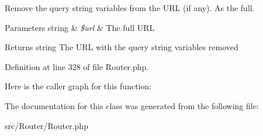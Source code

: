 Remove the query string variables from the U\+RL (if any). As the full.


\begin{DoxyParams}[1]{Parameters}
string & {\em \$url} & The full U\+RL\\
\hline
\end{DoxyParams}
\begin{DoxyReturn}{Returns}
string The U\+RL with the query string variables removed 
\end{DoxyReturn}


Definition at line 328 of file Router.\+php.

Here is the caller graph for this function\+:


The documentation for this class was generated from the following file\+:\begin{DoxyCompactItemize}
\item 
src/\+Router/Router.\+php\end{DoxyCompactItemize}
